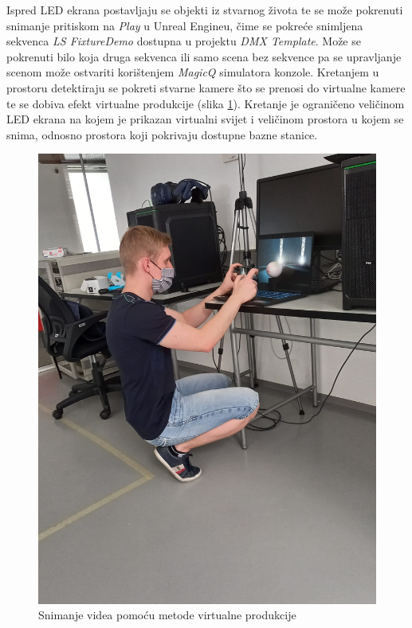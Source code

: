 \documentclass[times, utf8, zavrsni, numeric]{fer}
\begin{document}
Ispred LED ekrana postavljaju se objekti iz stvarnog života te se može pokrenuti snimanje pritiskom na \emph{Play} u Unreal Engineu, čime se pokreće snimljena sekvenca \emph{LS FixtureDemo} dostupna u projektu \emph{DMX Template}. Može se pokrenuti bilo koja druga sekvenca ili samo scena bez sekvence pa se upravljanje scenom može ostvariti korištenjem \emph{MagicQ} simulatora konzole. Kretanjem u prostoru detektiraju se pokreti stvarne kamere što se prenosi do virtualne kamere te se dobiva efekt virtualne produkcije (slika \ref{fig:slika 7-1}). Kretanje je ograničeno veličinom LED ekrana na kojem je prikazan virtualni svijet i veličinom prostora u kojem se snima, odnosno prostora koji pokrivaju dostupne bazne stanice.

\begin{figure}[htp]
	\centering
	\includegraphics[width=\linewidth]{slika 7-1.jpg}
	\caption{Snimanje videa pomoću metode virtualne produkcije}
	\label{fig:slika 7-1}
\end{figure}
\end{document}
